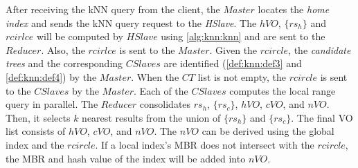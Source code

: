 After receiving the kNN query from the client, the $Master$ locates the \emph{home index} and sends the kNN query request to the \emph{HSlave}. The $hVO$, $\{rs_{h}\}$ and $rcirlce$ will be computed by $HSlave$ using \cref{alg:knn:knn} and are sent to the $Reducer$. Also, the $rcirlce$ is sent to the $Master$. Given the $rcircle$, the \emph{candidate trees} and the corresponding $CSlaves$ are identified (\cref{def:knn:def3} and \cref{def:knn:def4}) by the $Master$. When the $CT$ list is not empty, the $rcircle$ is sent to the $CSlaves$ by the $Master$. Each of the $CSlaves$ computes the local range query in parallel. The $Reducer$ consolidates $rs_{h}$, $\{rs_{c}\}$, $hVO$, $cVO$, and $nVO$. Then, it selects $k$ nearest results from the union of $\{rs_{h}\}$ and $\{rs_{c}\}$. The final VO list consists of $hVO$, $cVO$, and $nVO$. The $nVO$ can be derived using the global index and the $rcircle$. If a local index's MBR does not intersect with the $rcircle$, the MBR and hash value of the index will be added into $nVO$.

